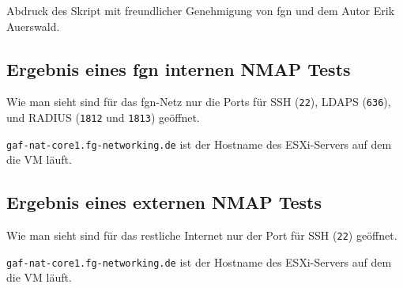 \documentclass[11pt,a4paper,titlepage=firstiscover,headsepline,bibtotoc]{scrartcl} %
\begin{document}
Abdruck des Skript mit freundlicher Genehmigung von fgn und dem Autor Erik Auerswald.


\newpage
\subsection{Ergebnis eines fgn internen NMAP Tests}\label{sec:NMAP-Test-int}

Wie man sieht sind für das fgn-Netz nur die Ports für SSH (\texttt{22}), LDAPS (\texttt{636}), und RADIUS (\texttt{1812} und \texttt{1813}) geöffnet.

\noindent\texttt{gaf-nat-core1.fg-networking.de} ist der Hostname des ESXi-Servers auf dem die VM läuft.

\newpage
\subsection{Ergebnis eines externen NMAP Tests}\label{sec:NMAP-Test-ext}

Wie man sieht sind für das restliche Internet nur der Port für SSH (\texttt{22}) geöffnet.

\noindent\texttt{gaf-nat-core1.fg-networking.de} ist der Hostname des ESXi-Servers auf dem die VM läuft.
\newpage


\cleardoublepage
{}
{}




\cleardoublepage
{}
{}


\cleardoublepage
{}
{}

\end{document}

